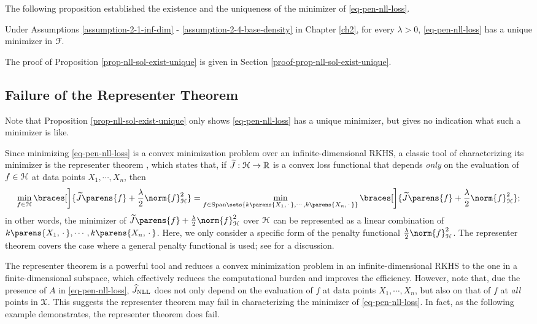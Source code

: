 The following proposition established the existence and the uniqueness of the minimizer of \eqref{eq-pen-nll-loss}. 

\begin{proposition}\label{prop-nll-sol-exist-unique}
	Under Assumptions \ref{assumption-2-1-inf-dim} - \ref{assumption-2-4-base-density} in Chapter \ref{ch2}, for every $\lambda > 0$, \eqref{eq-pen-nll-loss} has a unique minimizer in $\mathcal{F}$. 
\end{proposition}

The proof of Proposition \ref{prop-nll-sol-exist-unique} is given in Section \ref{proof-prop-nll-sol-exist-unique}. 

\subsection{Failure of the Representer Theorem}

Note that Proposition \ref{prop-nll-sol-exist-unique} only shows \eqref{eq-pen-nll-loss} has a unique minimizer, but gives no indication what such a minimizer is like. 

Since minimizing \eqref{eq-pen-nll-loss} is a convex minimization problem over an infinite-dimensional RKHS, a classic tool of characterizing its minimizer is the representer theorem \parencite{Kimeldorf1971-lf,Scholkopf2001-bb}, which states that, if $\widetilde{J}: \mathcal{H} \to \mathbb{R}$ is a convex loss functional that depends \emph{only} on the evaluation of $f \in \mathcal{H}$ at data points $X_1, \cdots, X_n$, then 
\begin{align*}
	\min_{f \in \calH} \braces[\bigg]{\widetilde{J} \parens{f} + \frac{\lambda}{2} \norm{f}_{\calH}^2} = \min_{f \in \mathrm{Span} \sets{k \parens{X_1, \,\cdot\,}, \cdots, k \parens{X_n, \,\cdot\,}}} \braces[\bigg]{\widetilde{J} \parens{f} + \frac{\lambda}{2} \norm{f}_{\calH}^2}; 
\end{align*}
in other words, the minimizer of $\widetilde{J} \parens{f} + \frac{\lambda}{2} \norm{f}_{\calH}^2$ over $\mathcal{H}$ can be represented as a linear combination of $k \parens{X_1, \,\cdot\,}, \cdots, k \parens{X_n, \,\cdot\,}$. Here, we only consider a specific form of the penalty functional $\frac{\lambda}{2} \norm{f}_{\calH}^2$. The representer theorem covers the case where a general penalty functional is used; see \textcite{Scholkopf2001-bb} for a discussion. 

The representer theorem is a powerful tool and reduces a convex minimization problem in an infinite-dimensional RKHS to the one in a finite-dimensional subspace, which effectively reduces the computational burden and improves the efficiency. However, note that, due the presence of $A$ in \eqref{eq-pen-nll-loss}, $\widehat{J}_{\mathrm{NLL}}$ does not only depend on the evaluation of $f$ at data points $X_1, \cdots, X_n$, but also on that of $f$ at \emph{all} points in $\mathcal{X}$. This suggests the representer theorem may fail in characterizing the minimizer of \eqref{eq-pen-nll-loss}. In fact, as the following example demonstrates, the representer theorem does fail. 

